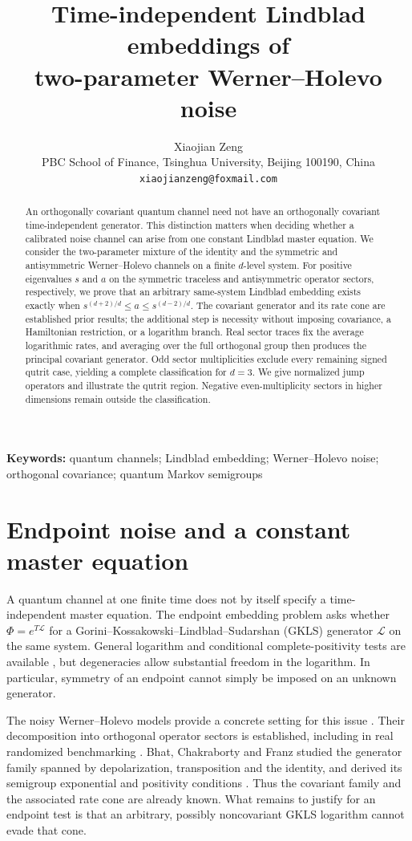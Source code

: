 \documentclass[11pt]{article}
\title{Time-independent Lindblad embeddings of\\
two-parameter Werner--Holevo noise}
\author{Xiaojian Zeng\\[2pt]
\small PBC School of Finance, Tsinghua University, Beijing 100190, China\\
\small \texttt{xiaojianzeng@foxmail.com}}
\date{}
\begin{document}
\maketitle

\begin{abstract}
An orthogonally covariant quantum channel need not have an orthogonally
covariant time-independent generator. This distinction matters when deciding
whether a calibrated noise channel can arise from one constant Lindblad
master equation. We consider the two-parameter mixture of the identity and
the symmetric and antisymmetric Werner--Holevo channels on a finite
$d$-level system. For positive eigenvalues $s$ and $a$ on the symmetric
traceless and antisymmetric operator sectors, respectively, we prove that
an arbitrary same-system Lindblad embedding exists exactly when
$s^{(d+2)/d}\leq a\leq s^{(d-2)/d}$.
The covariant generator and its rate cone are established prior results;
the additional step is necessity without imposing covariance, a
Hamiltonian restriction, or a logarithm branch. Real sector traces fix the
average logarithmic rates, and averaging over the full orthogonal group
then produces the principal covariant generator. Odd sector multiplicities
exclude every remaining signed qutrit case, yielding a complete
classification for $d=3$. We give normalized jump operators and illustrate
the qutrit region. Negative even-multiplicity sectors in higher dimensions
remain outside the classification.
\end{abstract}
\noindent\textbf{Keywords:} quantum channels; Lindblad embedding;
Werner--Holevo noise; orthogonal covariance; quantum Markov semigroups

\section{Endpoint noise and a constant master equation}

A quantum channel at one finite time does not by itself specify a
time-independent master equation. The endpoint embedding problem asks whether
$\Phi=e^{T\mathcal L}$ for a Gorini--Kossakowski--Lindblad--Sudarshan (GKLS)
generator $\mathcal L$ on the same system. General logarithm and conditional
complete-positivity tests are available \cite{Wolf2008}, but degeneracies
allow substantial freedom in the logarithm. In particular, symmetry of an
endpoint cannot simply be imposed on an unknown generator.

The noisy Werner--Holevo models provide a concrete setting for this issue
\cite{Karimipour2024,Roofeh2025}. Their decomposition into orthogonal operator
sectors is established, including in real randomized benchmarking
\cite{Hashagen2018}. Bhat, Chakraborty and Franz studied the generator family
spanned by depolarization, transposition and the identity, and derived its
semigroup exponential and positivity conditions \cite{Bhat2023}. Thus the
covariant family and the associated rate cone are already known. What remains
to justify for an endpoint test is that an arbitrary, possibly noncovariant
GKLS logarithm cannot evade that cone.
\end{document}
